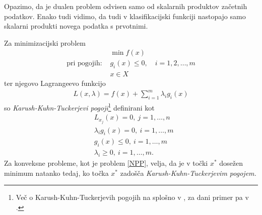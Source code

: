 \documentclass[mat1]{fmfdelo}
\begin{document}
Opazimo, da je dualen problem odvisen samo od skalarnih produktov začetnih podatkov. Enako tudi vidimo, da tudi v klasifikacijski funkciji nastopajo samo skalarni produkti novega podatka s prvotnimi. 

Za minimizacijski problem
\begin{align*}
	&\min f(x)\\ 
	\text{pri pogojih: } &g_i(x) \le 0, \quad i = 1,2,\ldots,m \\
	&x\in X
\end{align*}
ter njegovo Lagrangeevo funkcijo
\begin{align*}
	L(x, \lambda) = f(x) + \sum_{i=1}^{m}\lambda_ig_i(x)
\end{align*}
so \emph{Karush-Kuhn-Tuckerjevi pogoji}\footnote{Več o Karush-Kuhn-Tuckerjevih pogojih na splošno v \cite[str. 207--218]{ITNO}, za dani primer pa v \cite[str. 220 spodaj]{ESL}.} definirani kot
\begin{align*}
	&L_{x_j}(x) = 0,~ j = 1, \ldots, n \\
	&\lambda_ig_i(x) = 0,~ i = 1,\ldots,m \\
	&g_i(x) \le 0,~ i = 1,\ldots,m \\
	&\lambda_i \ge 0,~ i = 1,\ldots,m.
\end{align*}
Za konveksne probleme, kot je problem \eqref{NPP}, velja, da je v točki $x^*$ dosežen minimum natanko tedaj, ko točka $x^*$ zadošča \emph{Karush-Kuhn-Tuckerjevim pogojem.}
\end{document}
